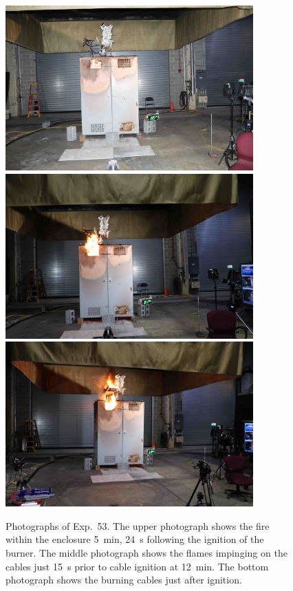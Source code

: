 \begin{figure}[p]
\centering
\includegraphics[height=2.50in]{../FIGURES/Test_53_5_min_24_s} \\ \vspace{0.1in}
\includegraphics[height=2.50in]{../FIGURES/Test_53_11_min_45_s} \\ \vspace{0.1in}
\includegraphics[height=2.50in]{../FIGURES/Test_53_ignition}
\caption[Photographs of Exp.~53]{Photographs of Exp.~53. The upper photograph shows the fire within the enclosure 5~min, 24~s following the ignition of the burner. The middle photograph shows the flames impinging on the cables just 15~s prior to cable ignition at 12~min. The bottom photograph shows the burning cables just after ignition.}
\label{fig:Test_53_photos}
\end{figure}


